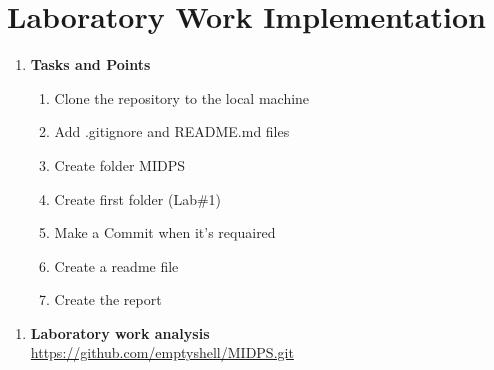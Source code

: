\documentclass[12pt,a4paper,titlepage]{article}
\begin{document}
	\section{Laboratory Work Implementation}
	\begin{enumerate}
		 \item \textbf{Tasks and Points} 
					
			\begin{enumerate}
				\item Clone the repository to the local machine
				\item Add .gitignore and README.md files
				\item Create folder MIDPS
				\item Create first folder (Lab\#1)
				\item Make a Commit when it's requaired
				\item Create a readme file
				\item Create the report
			\end{enumerate}
	\end{enumerate}
	\begin{enumerate}
		 \item \textbf{Laboratory work analysis} 
			\\[0.5cm]\url{https://github.com/emptyshell/MIDPS.git}
	\end{enumerate}		
		
		
		
\end{document}
